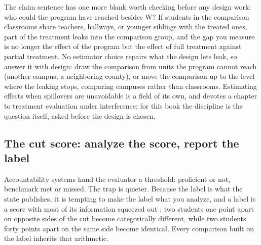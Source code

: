 The claim sentence has one more blank worth checking before any design work: who could the program have reached besides W? If students in the comparison classrooms share teachers, hallways, or younger siblings with the treated ones, part of the treatment leaks into the comparison group, and the gap you measure is no longer the effect of the program but the effect of full treatment against partial treatment. No estimator choice repairs what the design lets leak, so answer it with design: draw the comparison from units the program cannot reach (another campus, a neighboring county), or move the comparison up to the level where the leaking stops, comparing campuses rather than classrooms. Estimating effects when spillovers are unavoidable is a field of its own, and \textcite{huber2023causal} devotes a chapter to treatment evaluation under interference; for this book the discipline is the question itself, asked before the design is chosen.

\subsection{The cut score: analyze the score, report the label}\label{ch08-sc-cutscore}
Accountability systems hand the evaluator a threshold: proficient or not, benchmark met or missed. The trap is quieter. Because the label is what the state publishes, it is tempting to make the label what you analyze, and a label is a score with most of its information squeezed out \parencite{osborne2013cleaning}: two students one point apart on opposite sides of the cut become categorically different, while two students forty points apart on the same side become identical. Every comparison built on the label inherits that arithmetic.

